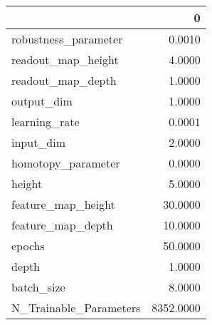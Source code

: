 \begin{tabular}{lr}
\toprule
{} &          0 \\
\midrule
robustness\_parameter   &     0.0010 \\
readout\_map\_height     &     4.0000 \\
readout\_map\_depth      &     1.0000 \\
output\_dim             &     1.0000 \\
learning\_rate          &     0.0001 \\
input\_dim              &     2.0000 \\
homotopy\_parameter     &     0.0000 \\
height                 &     5.0000 \\
feature\_map\_height     &    30.0000 \\
feature\_map\_depth      &    10.0000 \\
epochs                 &    50.0000 \\
depth                  &     1.0000 \\
batch\_size             &     8.0000 \\
N\_Trainable\_Parameters &  8352.0000 \\
\bottomrule
\end{tabular}
